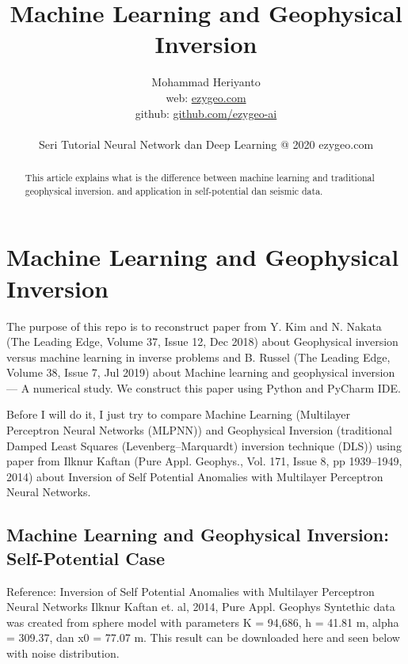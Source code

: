 \documentclass[12pt,oneside,a4paper]{article}
\begin{document}
\title{Machine Learning and Geophysical Inversion}
\author{Mohammad Heriyanto \\web: \href{https://ezygeo.com/}{ezygeo.com} \\ github: \href{https://github.com/ezygeo-ai/machine-learning-and-geophysical-inversion}{github.com/ezygeo-ai} \\~\\ Seri Tutorial Neural Network dan Deep Learning @ 2020 ezygeo.com}
   
\maketitle

\begin{abstract}
This article explains what is the difference between machine learning and traditional geophysical inversion. and application in self-potential dan seismic data.
\end{abstract}

\section{Machine Learning and Geophysical Inversion}
The purpose of this repo is to reconstruct paper from Y. Kim and N. Nakata (The Leading Edge, Volume 37, Issue 12, Dec 2018) about Geophysical inversion versus machine learning in inverse problems and B. Russel (The Leading Edge, Volume 38, Issue 7, Jul 2019) about Machine learning and geophysical inversion — A numerical study. We construct this paper using Python and PyCharm IDE.

Before I will do it, I just try to compare Machine Learning (Multilayer Perceptron Neural Networks (MLPNN)) and Geophysical Inversion (traditional Damped Least Squares (Levenberg–Marquardt) inversion technique (DLS)) using paper from Ilknur Kaftan (Pure Appl. Geophys., Vol. 171, Issue 8, pp 1939–1949, 2014) about Inversion of Self Potential Anomalies with Multilayer Perceptron Neural Networks.

\subsection{Machine Learning and Geophysical Inversion: Self-Potential Case}

Reference: Inversion of Self Potential Anomalies with Multilayer Perceptron Neural Networks Ilknur Kaftan et. al, 2014, Pure Appl. Geophys Syntethic data was created from sphere model with parameters K = 94,686, h = 41.81 m, alpha = 309.37, dan x0 = 77.07 m. This result can be downloaded here and seen below with noise distribution.
\end{document}

